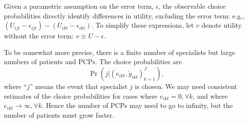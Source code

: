 \documentclass[12pt]{article}
\begin{document}
Given a parametric assumption on the error term, $\epsilon$, the observable choice probabilities directly identify differences in utility, excluding the error term: e.g., $(U_{ijt} - \epsilon_{ijt}) - (U_{ikt} - \epsilon_{ikt})$.
To simplify these expressions, let $v$ denote utility without the error term: $v \equiv U - \epsilon$.

To be somewhat more precise, there is a finite number of specialists but large numbers of patients and PCPs.
The choice probabilities are
\[
\Pr(j | (e_{ikt}, \check y_{ikt})_{k=1}^J) ,
\]
where ``$j$'' means the event that specialist $j$ is chosen.
We may need consistent estimates of the choice probabilities for cases where $e_{ikt} = 0, \forall k$, and where $e_{ikt} \to \infty, \forall k$.
Hence the number of PCPs may need to go to infinity, but the number of patients must grow faster.
\end{document}
